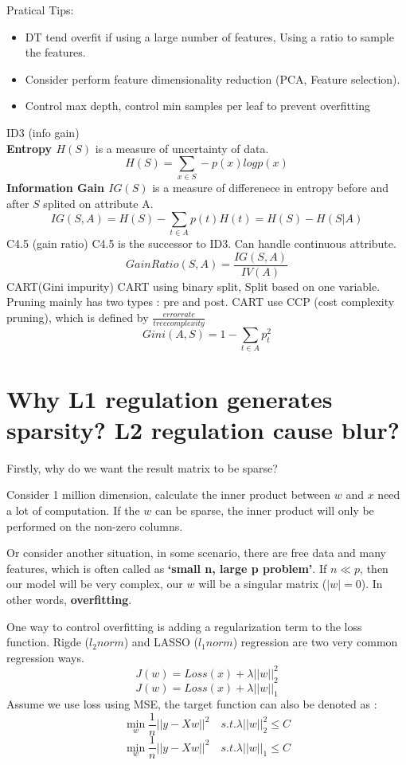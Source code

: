 \documentclass{article}
\begin{document}
\begin{CJK*}{UTF8}{gbsn}
Pratical Tips:
\begin{itemize}
\item DT tend overfit if using a large number of features, Using a ratio to sample the features.
\item Consider perform feature dimensionality reduction (PCA, Feature selection).
\item Control max depth, control min samples per leaf to prevent overfitting
\end{itemize}
ID3 (info gain) \\
\textbf{Entropy $H(S)$} is a measure of uncertainty of data. 
$$H(S)=\sum_{x \in S}-p(x)logp(x)$$
\textbf{Information Gain $IG(S)$} is a measure of differenece in entropy before and after $S$ splited on attribute A.
$$IG(S,A)=H(S)-\sum_{t \in A}p(t)H(t)=H(S)-H(S|A)$$
C4.5 (gain ratio)
C4.5 is the successor to ID3. Can handle continuous attribute.
$$GainRatio(S,A)=\frac{IG(S,A)}{IV(A)}$$
CART(Gini impurity)
CART using binary split, Split based on one variable. Pruning mainly has two types : pre and post. CART use CCP (cost complexity pruning), which is defined by $\frac{error rate}{tree complexity}$
$$Gini(A,S)=1-\sum_{t \in A} p_{t}^{2}$$


\section{Why L1 regulation generates sparsity? L2 regulation cause blur?}

Firstly, why do we want the result matrix to be sparse?

Consider 1 million dimension, calculate the inner product between $w$ and $x$ need a lot of computation. If the $w$ can be sparse, the inner product will only be performed on the non-zero columns.

Or consider another situation, in some scenario, there are free data and many features, which is often called as \textbf{`small n, large p problem'}. If $n \ll p $, then our model will be very complex, our $w$ will be a singular matrix ($|w|=0$). In other words, \textbf{overfitting}.

One way to control overfitting is adding a regularization term to the loss function. Rigde  ($l_{2} norm$) and LASSO ($l_{1} norm$) regression are two very common regression ways.
$$J(w)=Loss(x)+\lambda ||w||_{2}^{2}$$
$$J(w)=Loss(x)+\lambda ||w||_{1}$$
Assume we use loss using MSE, the target function can also be denoted as :
$$ \mathop{\min}_{w} \frac{1}{n}||y-Xw||^{2} \quad  s.t. \lambda ||w||_{2}^{2} \leq C $$
$$ \mathop{\min}_{w} \frac{1}{n}||y-Xw||^{2} \quad  s.t. \lambda ||w||_{1} \leq C $$


\end{CJK*}
\end{document}
